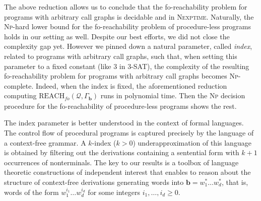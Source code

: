 \documentclass[final]{llncs}
\def\pat{{\mathbf{b}}}
\def\patg{{\Gamma_\pat}}
\def\foreach{\mathrm{REACH}_{\mathit{fo}}}
\begin{document}
The above reduction allows us to conclude that the fo-reachability
problem for programs with arbitrary call graphs is decidable and
in \textsc{Nexptime}. Naturally, the \textsc{Np}-hard lower
bound \cite{bik14} for the fo-reachability problem of procedure-less
programs holds in our setting as well.
Despite our best efforts, we did not close the complexity gap yet.
However we pinned down a natural parameter, called \emph{index},
related to programs with arbitrary call graphs, such that, when
setting this parameter to a fixed constant (like \(3\) in \(3\)-SAT),
the complexity of the resulting fo-reachability problem for programs
with arbitrary call graphs becomes \textsc{Np}-complete. Indeed, when
the index is fixed, the aforementioned reduction computing
\(\foreach(\mathcal{Q},\patg)\) runs in polynomial time. Then the
\textsc{Np} decision procedure for the fo-reachability of procedure-less
programs \cite{bik14} shows the rest.

The index parameter is better understood in the context of formal
languages. The control flow of procedural programs is captured
precisely by the language of a context-free grammar. A \(k\)-index (\(k>0\))
underapproximation of this language is obtained by filtering out the derivations 
containing a sentential form with \(k+1\) occurrences of nonterminals.
The key to our results is a toolbox of language theoretic
constructions of independent interest that enables to reason about the
structure of context-free derivations generating words into \(\pat = w_1^* \ldots w_d^*\), that
is, words of the form \(w_1^{i_1} \ldots w_d^{i_d}\) for some integers \(i_1,\ldots, i_d \geq 0\).
\end{document}
